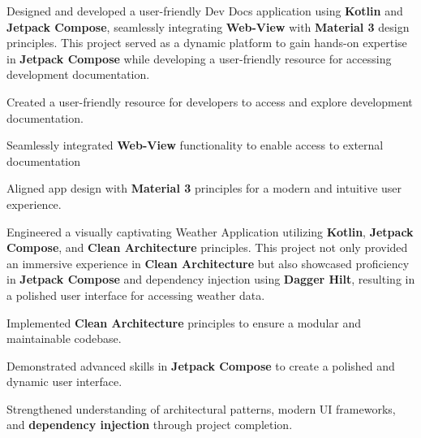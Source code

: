 \documentclass[bold]{deedy-resume-openfont}
\begin{document}
\begin{minipage}[t]{0.66\textwidth}
\begin{tightemize}
    \item Designed and developed a user-friendly Dev Docs application using \textbf{Kotlin} and \textbf{Jetpack Compose}, seamlessly integrating \textbf{Web-View} with \textbf{Material 3} design principles. This project served as a dynamic platform to gain hands-on expertise in \textbf{Jetpack Compose} while developing a user-friendly resource for accessing development documentation.
    \item Created a user-friendly resource for developers to access and explore development documentation.
    \item Seamlessly integrated \textbf{Web-View} functionality to enable access to external documentation
    \item Aligned app design with \textbf{Material 3} principles for a modern and intuitive user experience.
\end{tightemize}
\sectionsep

\begin{tightemize}
    \item Engineered a visually captivating Weather Application utilizing \textbf{Kotlin}, \textbf{Jetpack Compose}, and \textbf{Clean Architecture} principles. This project not only provided an immersive experience in \textbf{Clean Architecture} but also showcased proficiency in \textbf{Jetpack Compose} and dependency injection using \textbf{Dagger Hilt}, resulting in a polished user interface for accessing weather data.
    \item Implemented \textbf{Clean Architecture} principles to ensure a modular and maintainable codebase.
    \item Demonstrated advanced skills in \textbf{Jetpack Compose} to create a polished and dynamic user interface.
    \item Strengthened understanding of architectural patterns, modern UI frameworks, and \textbf{dependency injection} through project completion.
\end{tightemize}
\sectionsep


\end{minipage} 
\end{document}
